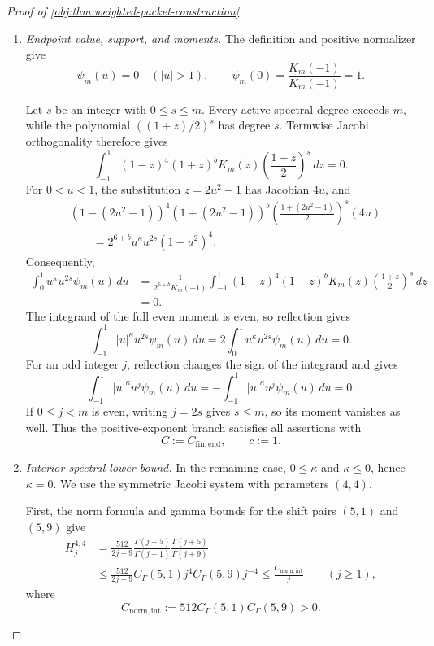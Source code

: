 \documentclass[11pt]{article}
\begin{document}
\begin{proof}[Proof of \cref{obj:thm:weighted-packet-construction}]
\begin{enumerate}
\item \emph{Endpoint value, support, and moments.}
The definition and positive normalizer give
\[
\psi_m(u)=0\quad(|u|>1),
\qquad
\psi_m(0)=\frac{K_m(-1)}{K_m(-1)}=1.
\]

Let \(s\) be an integer with \(0\le s\le m\). Every active spectral degree exceeds \(m\), while the polynomial
\(((1+z)/2)^s\) has degree \(s\). Termwise Jacobi orthogonality therefore gives
\[
\int_{-1}^1
(1-z)^4(1+z)^bK_m(z)
\left(\frac{1+z}{2}\right)^s\,dz=0.
\]
For \(0<u<1\), the substitution \(z=2u^2-1\) has Jacobian \(4u\), and
\[
\begin{split}
&(1-(2u^2-1))^4(1+(2u^2-1))^b
\left(\frac{1+(2u^2-1)}2\right)^s(4u)\\
&\qquad=
2^{6+b}u^\kappa u^{2s}(1-u^2)^4.
\end{split}
\]
Consequently,
\[
\begin{split}
\int_0^1u^\kappa u^{2s}\psi_m(u)\,du
&=
\frac1{2^{6+b}K_m(-1)}
\int_{-1}^1
(1-z)^4(1+z)^bK_m(z)
\left(\frac{1+z}{2}\right)^s\,dz\\
&=0.
\end{split}
\]
The integrand of the full even moment is even, so reflection gives
\[
\int_{-1}^1|u|^\kappa u^{2s}\psi_m(u)\,du
=
2\int_0^1u^\kappa u^{2s}\psi_m(u)\,du=0.
\]
For an odd integer \(j\), reflection changes the sign of the integrand and gives
\[
\int_{-1}^1|u|^\kappa u^j\psi_m(u)\,du
=
-\int_{-1}^1|u|^\kappa u^j\psi_m(u)\,du
=0.
\]
If \(0\le j<m\) is even, writing \(j=2s\) gives \(s\le m\), so its moment vanishes as well. Thus the positive-exponent branch satisfies all assertions with
\[
C:=C_{\mathrm{fin,end}},
\qquad c:=1.
\]

\item \emph{Interior spectral lower bound.}
In the remaining case, \(0\le\kappa\) and \(\kappa\le0\), hence \(\kappa=0\). We use the symmetric Jacobi system with parameters \((4,4)\).

First, the norm formula and gamma bounds for the shift pairs \((5,1)\) and \((5,9)\) give
\[
\begin{split}
H_j^{4,4}
&=
\frac{512}{2j+9}
\frac{\Gamma(j+5)}{\Gamma(j+1)}
\frac{\Gamma(j+5)}{\Gamma(j+9)}\\
&\le
\frac{512}{2j+9}
C_\Gamma(5,1)j^4 C_\Gamma(5,9)j^{-4}
\le\frac{C_{\mathrm{norm,int}}}{j}
\qquad(j\ge1),
\end{split}
\]
where
\[
C_{\mathrm{norm,int}}
:=512C_\Gamma(5,1)C_\Gamma(5,9)>0.
\]


\end{enumerate}
\end{proof}
\end{document}
